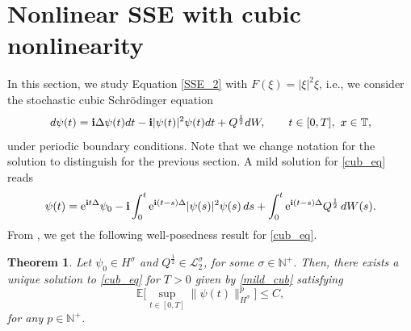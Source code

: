 \documentclass[a4paper]{amsart}
\newtheorem{theorem}{Theorem}[section]
\begin{document}
\section{Nonlinear SSE with cubic nonlinearity}
In this section, we study Equation \eqref{SSE_2} with $F(\xi)=|\xi|^2\xi$, i.e., we consider the stochastic cubic Schrödinger equation
\begin{equation}
\label{cub_eq}
d\psi(t) = {\bf i}\Delta \psi(t) dt-{\bf i}|\psi(t)|^2 \psi(t)   dt+Q^{\frac{1}{2}}dW, \qquad t\in[0,T],\  x \in \mathbb{T},
\end{equation}
under  periodic boundary conditions. Note that we change notation for the solution to distinguish for the previous section. A mild solution for \eqref{cub_eq} reads
\begin{equation}
    \label{mild_cub}
    \psi(t)={\rm e}^{{\bf i}t \Delta }\psi_0-{\bf i}\int_0^t {\rm e}^{{\bf i}(t-s)\Delta} |\psi(s)|^2 \psi(s)\,ds
    +\int_0^t {\rm e}^{{\bf i}(t-s)\Delta} Q^{\frac{1}{2}}\,dW(s).
 \end{equation}
From \cite{cui}, we get the following well-posedness result for \eqref{cub_eq}.
\begin{theorem}
\label{wp_cub}
    Let $\psi_0\in H^{\sigma}$ and $Q^{\frac{1}{2}}\in\mathcal{L}_2^\sigma$, for some $\sigma\in \mathbb{N}^+$. Then, there exists a unique solution to \eqref{cub_eq} for $T>0$ given by \eqref{mild_cub} satisfying
    $$
    \mathbb{E}\big[\sup_{t\in[0,T]}\|\psi(t)\|^p_{H^\sigma}\big]\le C,
    $$
    for any $p\in\mathbb{N}^+$.
\end{theorem}
\end{document}
